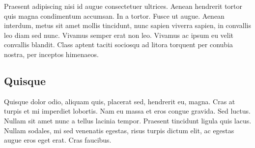 \documentclass[a4paper,twocolumn,10pt]{article}
\begin{document}
Praesent adipiscing nisi id augue consectetuer ultrices. Aenean hendrerit tortor
quis magna condimentum accumsan. In a tortor. Fusce ut augue. Aenean interdum,
metus sit amet mollis tincidunt, nunc sapien viverra sapien, in convallis leo
diam sed nunc. Vivamus semper erat non leo. Vivamus ac ipsum eu velit convallis
blandit. Class aptent taciti sociosqu ad litora torquent per conubia nostra, per
inceptos himenaeos.

\subsection*{Quisque}

Quisque dolor odio, aliquam quis, placerat sed, hendrerit eu, magna. Cras at
turpis et mi imperdiet lobortis. Nam eu massa et eros congue gravida. Sed
luctus. Nullam sit amet nunc a tellus lacinia tempor. Praesent tincidunt ligula
quis lacus. Nullam sodales, mi sed venenatis egestas, risus turpis dictum elit,
ac egestas augue eros eget erat. Cras faucibus.
\end{document}
